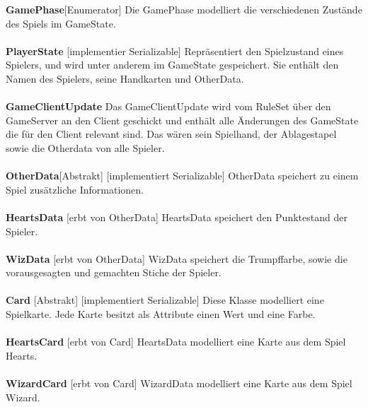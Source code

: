 \documentclass{article}
\begin{document}
\textbf{GamePhase}[Enumerator] Die GamePhase modelliert die verschiedenen Zustände des Spiels im GameState. \\ \\
		
\textbf{PlayerState} [implementier Serializable] Repräsentiert den Spielzustand eines Spielers, und wird unter anderem im GameState gespeichert. Sie enthält den Namen des Spielers, seine Handkarten und OtherData. \\ \\
		
\textbf{GameClientUpdate} Das GameClientUpdate wird vom RuleSet über den GameServer an den Client geschickt und enthält alle Änderungen des GameState die für den Client relevant sind. Das wären sein Spielhand, der Ablagestapel sowie die Otherdata  von alle Spieler. \\ \\
		
\textbf{OtherData}[Abstrakt] [implementiert Serializable] OtherData speichert zu einem Spiel zusätzliche Informationen. \\ \\
		
\textbf{HeartsData} [erbt von OtherData] HeartsData speichert den Punktestand der Spieler. \\ \\
		
\textbf{WizData} [erbt von OtherData] WizData speichert die Trumpffarbe, sowie die vorausgesagten und gemachten Stiche der Spieler. \\ \\
		
\textbf{Card} [Abstrakt] [implementiert Serializable] Diese Klasse modelliert eine Spielkarte. Jede Karte besitzt als Attribute einen Wert und eine Farbe. \\ \\
		
\textbf{HeartsCard} [erbt von Card]  HeartsData modelliert eine Karte aus dem Spiel Hearts. \\ \\
		
\textbf{WizardCard} [erbt von Card] WizardData modelliert eine Karte aus dem Spiel Wizard. \\ \\
\end{document}
